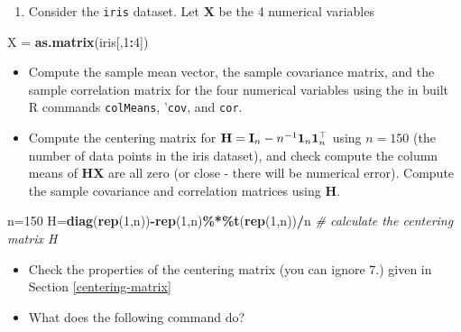 \documentclass[
]{book}
\newenvironment{Shaded}{\begin{snugshade}}{\end{snugshade}}
\newcommand{\CommentTok}[1]{\textcolor[rgb]{0.56,0.35,0.01}{\textit{#1}}}
\newcommand{\DecValTok}[1]{\textcolor[rgb]{0.00,0.00,0.81}{#1}}
\newcommand{\FunctionTok}[1]{\textcolor[rgb]{0.13,0.29,0.53}{\textbf{#1}}}
\newcommand{\NormalTok}[1]{#1}
\newcommand{\OtherTok}[1]{\textcolor[rgb]{0.56,0.35,0.01}{#1}}
\newcommand{\SpecialCharTok}[1]{\textcolor[rgb]{0.81,0.36,0.00}{\textbf{#1}}}
\providecommand{\tightlist}{%
  \setlength{\itemsep}{0pt}\setlength{\parskip}{0pt}}
\theoremstyle{definition}
\theoremstyle{definition}
\theoremstyle{definition}
\theoremstyle{definition}
\theoremstyle{remark}
\begin{document}
\begin{enumerate}
\def\labelenumi{\arabic{enumi}.}
\setcounter{enumi}{1}
\tightlist
\item
  Consider the \texttt{iris} dataset. Let \(\mathbf X\) be the 4 numerical variables
\end{enumerate}

\begin{Shaded}
\begin{Highlighting}[]
\NormalTok{X }\OtherTok{=} \FunctionTok{as.matrix}\NormalTok{(iris[,}\DecValTok{1}\SpecialCharTok{:}\DecValTok{4}\NormalTok{])}
\end{Highlighting}
\end{Shaded}

\begin{itemize}
\item
  Compute the sample mean vector, the sample covariance matrix, and the sample correlation matrix for the four numerical variables using the in built R commands \texttt{colMeans}, '\texttt{cov}, and \texttt{cor}.
\item
  Compute the centering matrix for
  \({\bf H}={\bf I}_n-n^{-1}{\bf 1}_n {\bf 1}_n^\top\)
  using \(n=150\) (the number of data points in the iris dataset), and check compute the column means of \(\mathbf H\mathbf X\) are all zero (or close - there will be numerical error). Compute the sample covariance and correlation matrices using \(\mathbf H\).
\end{itemize}

\begin{Shaded}
\begin{Highlighting}[]
\NormalTok{n}\OtherTok{=}\DecValTok{150}
\NormalTok{H}\OtherTok{=}\FunctionTok{diag}\NormalTok{(}\FunctionTok{rep}\NormalTok{(}\DecValTok{1}\NormalTok{,n))}\SpecialCharTok{{-}}\FunctionTok{rep}\NormalTok{(}\DecValTok{1}\NormalTok{,n)}\SpecialCharTok{\%*\%}\FunctionTok{t}\NormalTok{(}\FunctionTok{rep}\NormalTok{(}\DecValTok{1}\NormalTok{,n))}\SpecialCharTok{/}\NormalTok{n   }\CommentTok{\# calculate the centering matrix H}
\end{Highlighting}
\end{Shaded}

\begin{itemize}
\item
  Check the properties of the centering matrix (you can ignore 7.) given in Section \ref{centering-matrix}
\item
  What does the following command do?
\end{itemize}
\end{document}
